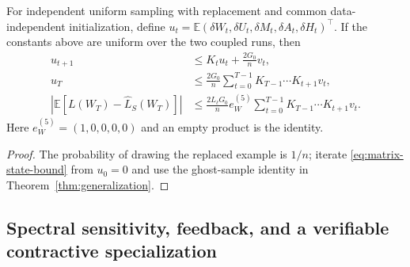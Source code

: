 \begin{corollary}
For independent uniform sampling with replacement and common data-independent
initialization, define
$u_t=\mathbb E(\delta W_t,\delta U_t,\delta M_t,\delta A_t,\delta H_t)^\top$.
If the constants above are uniform over the two coupled runs, then
\begin{align}
 u_{t+1}&\le K_tu_t+\frac{2G_0}{n}v_t,\\
 u_T&\le\frac{2G_0}{n}\sum_{t=0}^{T-1}
                  K_{T-1}\cdots K_{t+1}v_t,\label{eq:matrix-stability-product}\\
 |\mathbb E[L(W_T)-\widehat L_S(W_T)]|
 &\le\frac{2L_\ell G_0}{n}
 e_W^{(5)}\sum_{t=0}^{T-1}K_{T-1}\cdots K_{t+1}v_t.
\end{align}
Here $e_W^{(5)}=(1,0,0,0,0)$ and an empty product is the identity.
\end{corollary}
\begin{proof}
The probability of drawing the replaced example is $1/n$; iterate
\eqref{eq:matrix-state-bound} from $u_0=0$ and use the ghost-sample
identity in Theorem~\ref{thm:generalization}.
\end{proof}

\subsection{Spectral sensitivity, feedback, and a verifiable contractive specialization}
\label{app:spectral-stability}

